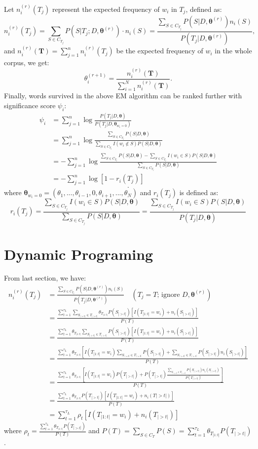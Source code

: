 \documentclass[12pt]{article}
\begin{document}
Let $n_i^{(r)}(T_j)$ represent the expected frequency of $w_i$ in $T_j$, defined as:
$$ n_i^{(r)}(T_j) = \sum_{S \in C_{T_j}} P(S|T_j; D, \bm{\theta}^{(r)}) \cdot n_i(S) = \frac{\sum_{S \in C_{T_j}} P(S|D, \bm{\theta}^{(r)})n_i(S)}{P(T_j|D, \bm{\theta}^{(r)})}, $$
and $n_i^{(r)}(\bm{T}) = \sum_{j=1}^n n_i^{(r)} (T_j)$ be the expected frequency of $w_i$ in the whole corpus, we get:
$$ \theta_i^{(r+1)} = \frac{n_i^{(r)}(\bm{T})}{\sum_{i=1}^N n_i^{(r)}(\bm{T})}. $$
Finally, words survived in the above EM algorithm can be ranked further with significance score $\psi_i$:
\begin{align*}
\psi_i &= \sum_{j=1}^n \log \frac{P(T_j|D, \bm{\theta})}{P(T_j|D, \bm{\theta}_{w_i=0})} \\
&= \sum_{j=1}^n \log \frac{\sum_{S \in C_{T_j}}P(S|D, \bm{\theta})}{\sum_{S \in C_{T_j}} I(w_i \notin S)P(S|D, \bm{\theta})} \\
&= -\sum_{j=1}^n \log \frac{\sum_{S \in C_{T_j}}P(S|D, \bm{\theta}) - \sum_{S \in C_{T_j}} I(w_i \in S)P(S|D, \bm{\theta})}{\sum_{S \in C_{T_j}}P(S|D, \bm{\theta})} \\
&= -\sum_{j=1}^n \log [1 - r_i(T_j)]
\end{align*}
$$ . $$
where $\bm{\theta}_{w_i=0} = (\theta_1, ..., \theta_{i-1}, 0, \theta_{i+1}, ..., \theta_N)$ and $r_i(T_j)$ is defined as:
$$ r_i(T_j) = \frac{\sum_{S \in C_{T_j}} I(w_i \in S)P(S|D, \bm{\theta})}{\sum_{S \in C_{T_j}}P(S|D, \bm{\theta})} = \frac{\sum_{S \in C_{T_j}} I(w_i \in S)P(S|D, \bm{\theta})}{P(T_j|D, \bm{\theta})} $$ 

\section{Dynamic Programing}
From last section, we have:
\begin{align*}
n_i^{(r)}(T_j) &= \frac{\sum_{S \in C_{T_j}} P(S|D, \bm{\theta}^{(r)})n_i(S)}{P(T_j|D, \bm{\theta}^{(r)})} \quad (T_j = T \text{; ignore } D, \bm{\theta}^{(r)}) \\
&= \frac{\sum_{t=1}^{\tau_L} \sum_{S_{|>t|} \in T_{|>t|}} \theta_{T_{|1:t|}}P(S_{|>t|}) [I(T_{|1:t|} = w_i) + n_i(S_{|>t|})]}{P(T)} \\
&= \frac{\sum_{t=1}^{\tau_L} \theta_{T_{|1:t|}} \sum_{S_{|>t|} \in T_{|>t|}} P(S_{|>t|}) [I(T_{|1:t|} = w_i) + n_i(S_{|>t|})]}{P(T)} \\
&= \frac{\sum_{t=1}^{\tau_L} \theta_{T_{|1:t|}} [I(T_{|1:t|} = w_i)\sum_{S_{|>t|} \in T_{|>t|}} P(S_{|>t|}) + \sum_{S_{|>t|} \in T_{|>t|}} P(S_{|>t|}) n_i(S_{|>t|})]}{P(T)} \\
&= \frac{\sum_{t=1}^{\tau_L} \theta_{T_{|1:t|}} [I(T_{|1:t|} = w_i) P(T_{|>t|}) + P(T_{|>t|}) \frac{\sum_{S_{|>t|} \in T_{|>t|}} P(S_{|>t|}) n_i(S_{|>t|})}{P(T_{|>t|})} ]}{P(T)} \\
&= \frac{\sum_{t=1}^{\tau_L} \theta_{T_{|1:t|}} P(T_{|>t|}) [I(T_{|1:t|} = w_i) + n_i(T|>t|)]}{P(T)} \\
&= \sum_{t=1}^{\tau_L} \rho_t [I(T_{|1:t|} = w_i) + n_i(T_{|>t|})]
\end{align*}
where $\rho_t = \frac{\sum_{t=1}^{\tau_L} \theta_{T_{|1:t|}} P(T_{|>t|})}{P(T)} $ and $P(T) = \sum_{S \in C_{T}} P(S) = \sum_{t=1}^{\tau_L} \theta_{T_{|1:t|}} P(T_{|>t|})$. 
\end{document}

